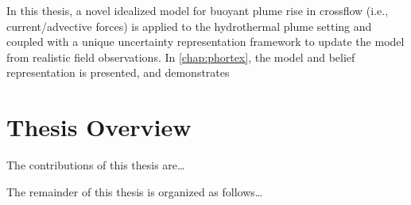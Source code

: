In this thesis, a novel idealized model for buoyant plume rise in crossflow (i.e., current/advective forces) is applied to the hydrothermal plume setting\autocite{tohidi2016highly} and coupled with a unique uncertainty representation framework to update the model from realistic field observations.
In \cref{chap:phortex}, the model and belief representation is presented, and demonstrates 

\section{Thesis Overview}
The contributions of this thesis are\dots

The remainder of this thesis is organized as follows\dots